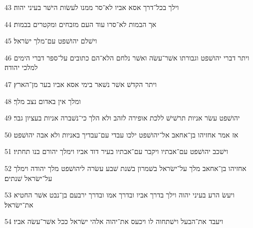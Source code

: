 \par 43 וילך בכל־דרך אסא אביו לא־סר ממנו לעשׂות הישׁר בעיני יהוה׃
\par 44 אך הבמות לא־סרו עוד העם מזבחים ומקטרים בבמות׃
\par 45 וישׁלם יהושׁפט עם־מלך ישׂראל׃
\par 46 ויתר דברי יהושׁפט וגבורתו אשׁר־עשׂה ואשׁר נלחם הלא־הם כתובים על־ספר דברי הימים למלכי יהודה׃
\par 47 ויתר הקדשׁ אשׁר נשׁאר בימי אסא אביו בער מן־הארץ׃
\par 48 ומלך אין באדום נצב מלך׃
\par 49 יהושׁפט עשׂר אניות תרשׁישׁ ללכת אופירה לזהב ולא הלך כי־נשׁברה אניות בעציון גבר׃
\par 50 אז אמר אחזיהו בן־אחאב אל־יהושׁפט ילכו עבדי עם־עבדיך באניות ולא אבה יהושׁפט׃
\par 51 וישׁכב יהושׁפט עם־אבתיו ויקבר עם־אבתיו בעיר דוד אביו וימלך יהורם בנו תחתיו׃
\par 52 אחזיהו בן־אחאב מלך על־ישׂראל בשׁמרון בשׁנת שׁבע עשׂרה ליהושׁפט מלך יהודה וימלך על־ישׂראל שׁנתים׃
\par 53 ויעשׂ הרע בעיני יהוה וילך בדרך אביו ובדרך אמו ובדרך ירבעם בן־נבט אשׁר החטיא את־ישׂראל׃
\par 54 ויעבד את־הבעל וישׁתחוה לו ויכעס את־יהוה אלהי ישׂראל ככל אשׁר־עשׂה אביו׃


